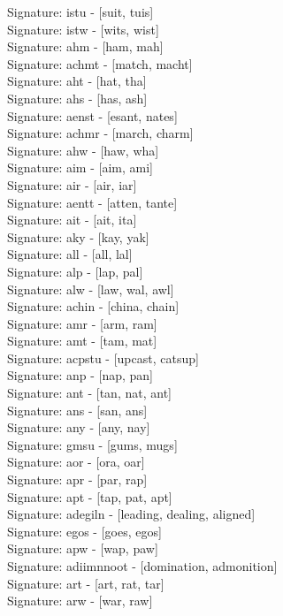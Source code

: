 Signature: {istu} - [suit, tuis] \\
Signature: {istw} - [wits, wist] \\
Signature: {ahm} - [ham, mah] \\
Signature: {achmt} - [match, macht] \\
Signature: {aht} - [hat, tha] \\
Signature: {ahs} - [has, ash] \\
Signature: {aenst} - [esant, nates] \\
Signature: {achmr} - [march, charm] \\
Signature: {ahw} - [haw, wha] \\
Signature: {aim} - [aim, ami] \\
Signature: {air} - [air, iar] \\
Signature: {aentt} - [atten, tante] \\
Signature: {ait} - [ait, ita] \\
Signature: {aky} - [kay, yak] \\
Signature: {all} - [all, lal] \\
Signature: {alp} - [lap, pal] \\
Signature: {alw} - [law, wal, awl] \\
Signature: {achin} - [china, chain] \\
Signature: {amr} - [arm, ram] \\
Signature: {amt} - [tam, mat] \\
Signature: {acpstu} - [upcast, catsup] \\
Signature: {anp} - [nap, pan] \\
Signature: {ant} - [tan, nat, ant] \\
Signature: {ans} - [san, ans] \\
Signature: {any} - [any, nay] \\
Signature: {gmsu} - [gums, mugs] \\
Signature: {aor} - [ora, oar] \\
Signature: {apr} - [par, rap] \\
Signature: {apt} - [tap, pat, apt] \\
Signature: {adegiln} - [leading, dealing, aligned] \\
Signature: {egos} - [goes, egos] \\
Signature: {apw} - [wap, paw] \\
Signature: {adiimnnoot} - [domination, admonition] \\
Signature: {art} - [art, rat, tar] \\
Signature: {arw} - [war, raw] \\
